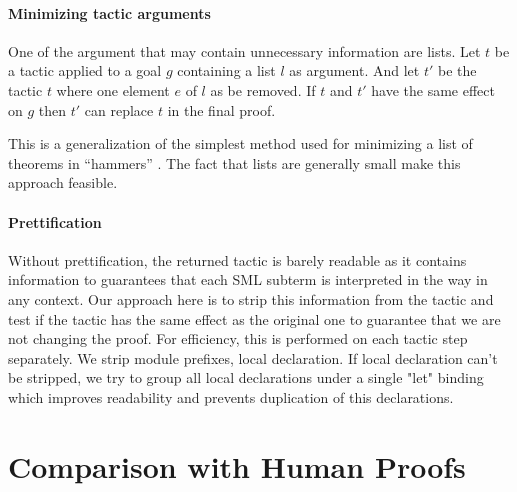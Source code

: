 \documentclass[runningheads,a4paper,draft]{svjour3}
\newcommand{\todoi}[1]{\todo[inline]{#1}}
\def\sml{\textsf{SML}\xspace}
\begin{document}
\paragraph{Minimizing tactic arguments}
One of the argument that may contain unnecessary information are lists.
Let $t$ be a tactic applied to a goal $g$ containing a list $l$ as argument. 
And let $t'$ be the tactic $t$ where one element $e$ of $l$ as be removed. If 
$t$ and $t'$ have the same effect on $g$ then $t'$ can replace $t$ in the final 
proof.

This is a generalization of the simplest method used for minimizing a list of 
theorems in ``hammers'' \cite{hammers4qed}. The fact that lists are generally small
make this approach feasible.

\paragraph{Prettification}
Without prettification, the returned tactic is barely readable as it contains 
information to guarantees that each \sml subterm is interpreted in the way in 
any context. Our approach here is to strip this information from the tactic and 
test if the tactic has the same effect as the original one to guarantee that we 
are not changing the proof. For efficiency, 
this is performed on each tactic step separately. We strip module prefixes, 
local declaration. If local declaration can't be 
stripped, we try to group all local declarations under a single "let" binding 
which improves readability and prevents duplication of this declarations.

\todoi{Example prettified proof}


\section{Comparison with Human Proofs}
\end{document}
